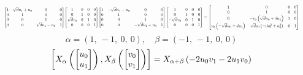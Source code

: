 \documentclass[11pt]{article}
\theoremstyle{definition}
\begin{document}
\[
\scaletoalign{\textwidth}{{\left[\begin{matrix}1 & \sqrt{d} u_{1} + u_{0} & 0 & 0\\0 & 1 & 0 & 0\\0 & 0 & 1 & 0\\0 & 0 & \sqrt{d} u_{1} - u_{0} & 1\end{matrix}\right]} {\left[\begin{matrix}1 & 0 & 0 & 0\\0 & 1 & 0 & 0\\\sqrt{d} v_{0} & 0 & 1 & 0\\0 & 0 & 0 & 1\end{matrix}\right]} {\left[\begin{matrix}1 & - \sqrt{d} u_{1} - u_{0} & 0 & 0\\0 & 1 & 0 & 0\\0 & 0 & 1 & 0\\0 & 0 & - \sqrt{d} u_{1} + u_{0} & 1\end{matrix}\right]} {\left[\begin{matrix}1 & 0 & 0 & 0\\0 & 1 & 0 & 0\\- \sqrt{d} v_{0} & 0 & 1 & 0\\0 & 0 & 0 & 1\end{matrix}\right]} = {\left[\begin{matrix}1 & 0 & 0 & 0\\0 & 1 & 0 & 0\\0 & - v_{0} \left(\sqrt{d} u_{0} + d u_{1}\right) & 1 & 0\\v_{0} \left(- \sqrt{d} u_{0} + d u_{1}\right) & \sqrt{d} v_{0} \left(- d u_{1}^{2} + u_{0}^{2}\right) & 0 & 1\end{matrix}\right]}}
\]
\[
\alpha = \left( 1, \  -1, \  0, \  0\right), \quad \beta = \left( -1, \  -1, \  0, \  0\right)
\]
\[
\scaletoalign{\textwidth}{\left[ X_{\alpha}\left(\left[\begin{matrix}u_{0}\\u_{1}\end{matrix}\right]\right), X_{\beta}\left(\left[\begin{matrix}v_{0}\\v_{1}\end{matrix}\right]\right) \right] = X_{\alpha + \beta}\left(- 2 u_{0} v_{1} - 2 u_{1} v_{0}\right)}
\]
\end{document}
